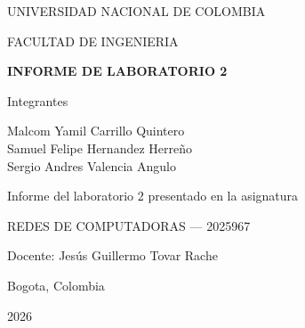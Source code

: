 

\begin{titlepage}
\centering

\vspace*{4cm}

{\large
UNIVERSIDAD NACIONAL DE COLOMBIA
}

\vspace{1cm}

{\large
FACULTAD DE INGENIERIA
}

\vspace{3cm}

{\Large
\textbf{INFORME DE LABORATORIO 2}
}

\vspace{3cm}

{\large
Integrantes
}

\vspace{0.5cm}

{\large
Malcom Yamil Carrillo Quintero \\
Samuel Felipe Hernandez Herreño \\
Sergio Andres Valencia Angulo
}

\vspace{3cm}

{\large
Informe del laboratorio 2 presentado en la asignatura
}

\vspace{0.5cm}

{\large
REDES DE COMPUTADORAS — 2025967
}

\vspace{0.5cm}

{\large
Docente: Jesús Guillermo Tovar Rache
}

\vfill

{\large
Bogota, Colombia
}

\vspace{0.3cm}

{\large
2026
}

\end{titlepage}
